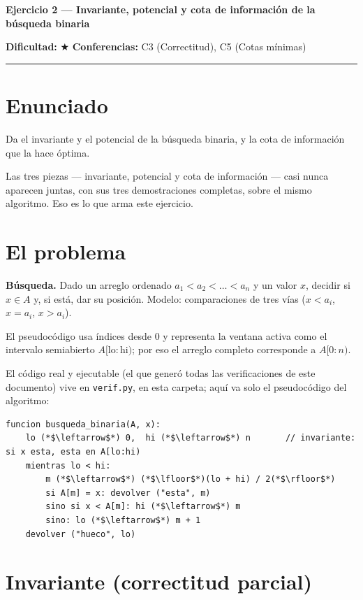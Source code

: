 \documentclass[11pt]{article}
\begin{document}
{\LARGE\bfseries\color{azultitulo} Ejercicio 2 --- Invariante, potencial y cota de información de la búsqueda binaria}

\vspace{2pt}
\textbf{Dificultad:} $\bigstar$ \quad \textbf{Conferencias:} C3 (Correctitud), C5 (Cotas mínimas)
\vspace{8pt}
\hrule
\vspace{12pt}

\section*{Enunciado}
\begin{enunciado}
Da el invariante y el potencial de la búsqueda binaria, y la cota de información que la hace óptima.
\end{enunciado}

Las tres piezas --- invariante, potencial y cota de información --- casi nunca aparecen juntas, con sus
tres demostraciones completas, sobre el mismo algoritmo. Eso es lo que arma este ejercicio.

\section{El problema}

\textbf{Búsqueda.} Dado un arreglo ordenado $a_1<a_2<\dots<a_n$ y un valor $x$, decidir si $x\in A$ y, si
está, dar su posición. Modelo: comparaciones de tres vías ($x<a_i$, $x=a_i$, $x>a_i$).

El pseudocódigo usa índices desde $0$ y representa la ventana activa como el intervalo semiabierto
$A[\mathrm{lo}:\mathrm{hi})$; por eso el arreglo completo corresponde a $A[0:n)$.

El código real y ejecutable (el que generó todas las verificaciones de este documento) vive en
\texttt{verif.py}, en esta carpeta; aquí va solo el pseudocódigo del algoritmo:

\begin{lstlisting}[style=pseudo]
funcion busqueda_binaria(A, x):
    lo (*$\leftarrow$*) 0,  hi (*$\leftarrow$*) n       // invariante: si x esta, esta en A[lo:hi)
    mientras lo < hi:
        m (*$\leftarrow$*) (*$\lfloor$*)(lo + hi) / 2(*$\rfloor$*)
        si A[m] = x: devolver ("esta", m)
        sino si x < A[m]: hi (*$\leftarrow$*) m
        sino: lo (*$\leftarrow$*) m + 1
    devolver ("hueco", lo)
\end{lstlisting}

\section{Invariante (correctitud parcial)}
\end{document}
